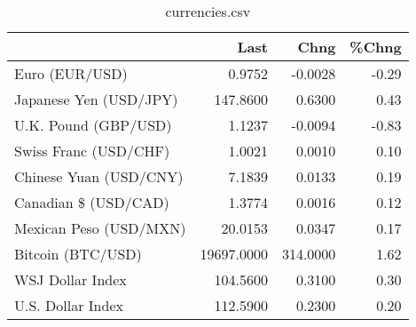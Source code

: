 \documentclass{article}%
\begin{document}
%


\begin{table}[htbp]%
\caption{currencies.csv}%
\centering%
\begin{adjustbox}{width=1\textwidth}%
\begin{tabular}{lrrr}
\toprule
                       &       Last &     Chng &  \%Chng \\
\midrule
        Euro (EUR/USD) &     0.9752 &  -0.0028 &  -0.29 \\
Japanese Yen (USD/JPY) &   147.8600 &   0.6300 &   0.43 \\
  U.K. Pound (GBP/USD) &     1.1237 &  -0.0094 &  -0.83 \\
 Swiss Franc (USD/CHF) &     1.0021 &   0.0010 &   0.10 \\
Chinese Yuan (USD/CNY) &     7.1839 &   0.0133 &   0.19 \\
  Canadian \$ (USD/CAD) &     1.3774 &   0.0016 &   0.12 \\
Mexican Peso (USD/MXN) &    20.0153 &   0.0347 &   0.17 \\
     Bitcoin (BTC/USD) & 19697.0000 & 314.0000 &   1.62 \\
      WSJ Dollar Index &   104.5600 &   0.3100 &   0.30 \\
     U.S. Dollar Index &   112.5900 &   0.2300 &   0.20 \\
\bottomrule
\end{tabular}
%
\end{adjustbox}%
\end{table}

%
\end{document}

